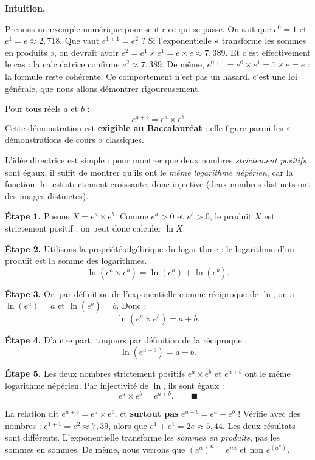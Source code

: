 \documentclass[11pt]{article}
\begin{document}
\textbf{Intuition.}\par
Prenons un exemple numérique pour sentir ce qui se passe. On sait que $e^0 = 1$ et $e^1 = e \approx 2{,}718$. Que vaut $e^{1+1} = e^2$ ? Si l'exponentielle « transforme les sommes en produits », on devrait avoir $e^2 = e^1 \times e^1 = e \times e \approx 7{,}389$. Et c'est effectivement le cas : la calculatrice confirme $e^2 \approx 7{,}389$. De même, $e^{0+1} = e^0 \times e^1 = 1 \times e = e$ : la formule reste cohérente. Ce comportement n'est pas un hasard, c'est une loi générale, que nous allons démontrer rigoureusement.

\begin{propriete}
Pour tous réels $a$ et $b$ :
\[
\boxed{e^{a+b} = e^a \times e^b}
\]
Cette démonstration est \textbf{exigible au Baccalauréat} : elle figure parmi les « démonstrations de cours » classiques.
\end{propriete}

\begin{experience}
L'idée directrice est simple : pour montrer que deux nombres \emph{strictement positifs} sont égaux, il suffit de montrer qu'ils ont le \emph{même logarithme népérien}, car la fonction $\ln$ est strictement croissante, donc injective (deux nombres distincts ont des images distinctes).

\textbf{Étape 1.} Posons $X = e^a \times e^b$. Comme $e^a > 0$ et $e^b > 0$, le produit $X$ est strictement positif : on peut donc calculer $\ln X$.

\textbf{Étape 2.} Utilisons la propriété algébrique du logarithme : le logarithme d'un produit est la somme des logarithmes.
\[
\ln\!\left(e^a \times e^b\right) = \ln(e^a) + \ln(e^b).
\]

\textbf{Étape 3.} Or, par définition de l'exponentielle comme réciproque de $\ln$, on a $\ln(e^a) = a$ et $\ln(e^b) = b$. Donc :
\[
\ln\!\left(e^a \times e^b\right) = a + b.
\]

\textbf{Étape 4.} D'autre part, toujours par définition de la réciproque :
\[
\ln\!\left(e^{a+b}\right) = a + b.
\]

\textbf{Étape 5.} Les deux nombres strictement positifs $e^a \times e^b$ et $e^{a+b}$ ont le même logarithme népérien. Par injectivité de $\ln$, ils sont égaux :
\[
e^a \times e^b = e^{a+b}. \qquad \blacksquare
\]
\end{experience}

\begin{attention}
La relation dit $e^{a+b} = e^a \times e^b$, et \textbf{surtout pas} $e^{a+b} = e^a + e^b$ ! Vérifie avec des nombres : $e^{1+1} = e^2 \approx 7{,}39$, alors que $e^1 + e^1 = 2e \approx 5{,}44$. Les deux résultats sont différents. L'exponentielle transforme les \emph{sommes en produits}, pas les sommes en sommes. De même, nous verrons que $(e^a)^n = e^{na}$ et non $e^{(a^n)}$.
\end{attention}
\end{document}
